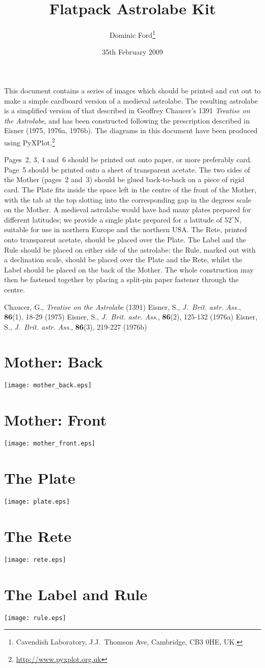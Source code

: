 \documentclass[a4paper,onecolumn,10pt]{article}
\title{\vspace{-3cm}Flatpack Astrolabe Kit}
\author{Dominic Ford\footnote{Cavendish Laboratory, J.J.\ Thomson Ave, Cambridge, CB3 0HE, UK.}}
\date{35th February 2009}
\begin{document}
\maketitle
\setcounter{footnote}{2}

This document contains a series of images which should be printed and cut out
to make a simple cardboard version of a medieval astrolabe. The resulting
astrolabe is a simplified version of that described in Geoffrey Chaucer's 1391
{\it Treatise on the Astrolabe}, and has been constructed following the
prescription described in Eisner (1975, 1976a, 1976b). The diagrams in this
document have been produced using
PyXPlot.\footnote{\url{http://www.pyxplot.org.uk}}

Pages~2, 3, 4 and~6 should be printed out onto paper, or more preferably card.
Page~5 should be printed onto a sheet of transparent acetate. The two sides of
the Mother (pages~2 and~3) should be glued back-to-back on a piece of rigid
card. The Plate fits inside the space left in the centre of the front of the
Mother, with the tab at the top slotting into the corresponding gap in the
degrees scale on the Mother. A medieval astrolabe would have had many plates
prepared for different latitudes; we provide a single plate prepared for a
latitude of $52^\circ$N, suitable for use in northern Europe and the northern
USA. The Rete, printed onto transparent acetate, should be placed over the
Plate.  The Label and the Rule should be placed on either side of the
astrolabe: the Rule, marked out with a declination scale, should be placed over
the Plate and the Rete, whilst the Label should be placed on the back of the
Mother. The whole construction may then be fastened together by placing a
split-pin paper fastener through the centre.

\begin{thebibliography}{9}
Chaucer, G., \textit{Treatise on the Astrolabe} (1391)
Eisner, S., \textit{J.\ Brit. astr. Ass.}, \textbf{86}(1), 18-29 (1975)
Eisner, S., \textit{J.\ Brit. astr. Ass.}, \textbf{86}(2), 125-132 (1976a)
Eisner, S., \textit{J.\ Brit. astr. Ass.}, \textbf{86}(3), 219-227 (1976b)
\end{thebibliography}

\newpage
\section*{Mother: Back}
\vspace{-1cm}\centerline{\texttt{[image: mother\_back.eps]}}
\section*{Mother: Front}
\vspace{-1cm}\centerline{\texttt{[image: mother\_front.eps]}}
\section*{The Plate}
\centerline{\texttt{[image: plate.eps]}}
\section*{The Rete}
\centerline{\texttt{[image: rete.eps]}}
\section*{The Label and Rule}
\centerline{\texttt{[image: rule.eps]}}
\end{document}
